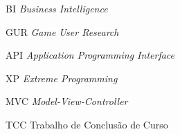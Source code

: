 \begin{siglas}
  \item[BI] \textit{Business Intelligence}
  \item[GUR] \textit{Game User Research}
  \item[API] \textit{Application Programming Interface}
  \item[XP] \textit{Extreme Programming}
  \item[MVC] \textit{Model-View-Controller}
  \item[TCC] Trabalho de Conclusão de Curso
\end{siglas}
